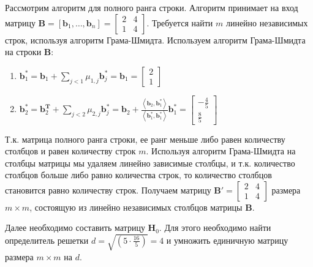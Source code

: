 Рассмотрим алгоритм для полного ранга строки. Алгоритм принимает на вход матрицу $ \mathbf{B} = \left[ \mathbf{b}_1, \ldots, \mathbf{b}_n \right] =
\left[ \begin{array}{cccc}
2 & 4 \\
1 & 4
\end{array} \right] $. Требуется найти $ m $ линейно независимых строк, используя алгоритм Грама-Шмидта. Используем алгоритм Грама-Шмидта на строки $ \mathbf{B} $:

\begin{enumerate}

\item $ \mathbf{b}^*_1 = \mathbf{b}_1 + \sum\limits_{j < 1} \mu_{1, j}\mathbf{b}^*_j = \mathbf{b}_1 = \left[ \begin{array}{cccc}
2 \\ 
1 
\end{array}
\right]$

\item $ \mathbf{b}^*_2 = \mathbf{b}^{\mathbf{T}}_2 + \sum\limits_{j < 2} \mu_{2, j}\mathbf{b}^*_j = \mathbf{b}_2 + \frac{\left\langle \mathbf{b}_2, \mathbf{b}^*_1 \right\rangle}{\left\langle \mathbf{b}^*_1, \mathbf{b}^*_1 \right\rangle} \mathbf{b}^*_1 = \left[ \begin{array}{cccc}
-\frac{4}{5} \\
\frac{8}{5}
\end{array}
\right]$

\end{enumerate}

Т.к. матрица полного ранга строки, ее ранг меньше либо равен количеству столбцов и равен количеству строк $ m $. Используя алгоритм Грама-Шмидта на столбцы матрицы мы удаляем линейно зависимые столбцы, и т.к. количество столбцов больше либо равно количества строк, то количество столбцов становится равно количеству строк. Получаем матрицу $ \mathbf{B}' = \left[\begin{array}{cccc}
2 & 4 \\
1 & 4
\end{array}\right] $ размера $ m \times m $, состоящую из линейно независимых столбцов матрицы $ \mathbf{B} $.

Далее необходимо составить матрицу $ \mathbf{H}_0 $. Для этого необходимо найти определитель решетки $ d = \sqrt{(5 \cdot \frac{16}{5})} = 4 $ и умножить единичную матрицу размера $ m \times m $ на $ d $. 

